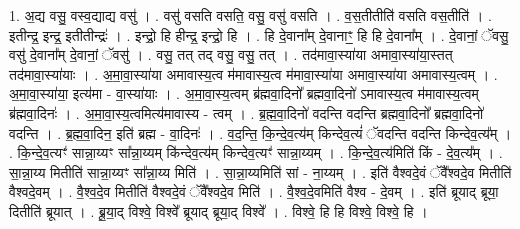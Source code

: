 \documentclass[17pt]{extarticle}
\begin{document}
1. अ॒द्य वसु॒ वस्व॒द्याद्य वसु॑ । . वसु॑ वसति वसति॒ वसु॒ वसु॑ वसति । . व॒स॒तीतीति॑ वसति वस॒तीति॑ । . इतीन्द्र॒ इन्द्र॒ इतीतीन्द्रः॑ । . इन्द्रो॒ हि हीन्द्र॒ इन्द्रो॒ हि । . हि दे॒वाना᳚म् दे॒वानाꣳ॒॒ हि हि दे॒वाना᳚म् । . दे॒वानां॒ ॅवसु॒ वसु॑ दे॒वाना᳚म् दे॒वानां॒ ॅवसु॑ । . वसु॒ तत् तद् वसु॒ वसु॒ तत् । . तद॑मावा॒स्या॑या अमावा॒स्या॑या॒स्तत् तद॑मावा॒स्या॑याः । . अ॒मा॒वा॒स्या॑या अमावास्य॒त्व म॑मावास्य॒त्व म॑मावा॒स्या॑या अमावा॒स्या॑या अमावास्य॒त्वम् । . अ॒मा॒वा॒स्या॑या॒ इत्य॑मा - वा॒स्या॑याः । . अ॒मा॒वा॒स्य॒त्वम् ब्र॑ह्मवा॒दिनो᳚ ब्रह्मवा॒दिनो॑ ऽमावास्य॒त्व म॑मावास्य॒त्वम् ब्र॑ह्मवा॒दिनः॑ । . अ॒मा॒वा॒स्य॒त्वमित्य॑मावास्य - त्वम् । . ब्र॒ह्म॒वा॒दिनो॑ वदन्ति वदन्ति ब्रह्मवा॒दिनो᳚ ब्रह्मवा॒दिनो॑ वदन्ति । . ब्र॒ह्म॒वा॒दिन॒ इति॑ ब्रह्म - वा॒दिनः॑ । . व॒द॒न्ति॒ कि॒न्दे॒व॒त्य॑म् किन्देव॒त्यं॑ ॅवदन्ति वदन्ति किन्देव॒त्य᳚म् । . कि॒न्दे॒व॒त्यꣳ॑ सान्ना॒य्यꣳ सा᳚न्ना॒य्यम् कि॑न्देव॒त्य॑म् किन्देव॒त्यꣳ॑ सान्ना॒य्यम् । . कि॒न्दे॒व॒त्य॑मिति॑ किं - दे॒व॒त्य᳚म् । . सा॒न्ना॒य्य मितीति॑ सान्ना॒य्यꣳ सा᳚न्ना॒य्य मिति॑ । . सा॒न्ना॒य्यमिति॑ सां - ना॒य्यम् । . इति॑ वैश्वदे॒वं ॅवै᳚श्वदे॒व मितीति॑ वैश्वदे॒वम् । . वै॒श्व॒दे॒व मितीति॑ वैश्वदे॒वं ॅवै᳚श्वदे॒व मिति॑ । . वै॒श्व॒दे॒वमिति॑ वैश्व - दे॒वम् । . इति॑ ब्रूयाद् ब्रूया॒ दितीति॑ ब्रूयात् । . ब्रू॒या॒द् विश्वे॒ विश्वे᳚ ब्रूयाद् ब्रूया॒द् विश्वे᳚ । . विश्वे॒ हि हि विश्वे॒ विश्वे॒ हि । \newline
\end{document}
